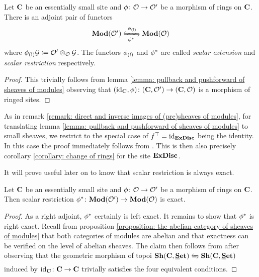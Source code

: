 \begin{corollary}
	\label{corollary: change of rings}
	
	Let ${{\mathbf{C}}}$ be an essentially small site and $\phi\colon {\mathcal{O}} \to {\mathcal{O}}'$ be a morphism of rings on ${{\mathbf{C}}}$. There is an adjoint pair of functors
		$$\mod {\structsymbol'} \xleftrightarrows{\scalarExtension{\phi}}{\scalarRestriction{\phi}} \mod\structsymbol$$
	where ${\phi_{(!)}}{\mathcal{G}} \coloneqq {\mathcal{O}}' \otimes_{\mathcal{O}} {\mathcal{G}}$. The functors ${\phi_{(!)}}$ and ${\phi^\ast}$ are called \emph{scalar extension} and \emph{scalar restriction} respectively.
\end{corollary}
\begin{proof}
	This trivially follows from lemma \ref{lemma: pullback and pushforward of sheaves of modules} observing that $(\mathrm{id}_{{\mathbf{C}}}, \phi)\colon ({{\mathbf{C}}},{\mathcal{O}}')\to({{\mathbf{C}}}, {\mathcal{O}})$ is a morphism of ringed sites.
\end{proof}


\begin{remark}
	As in remark \ref{remark: direct and inverse images of (pre)sheaves of modules}, for translating lemma \ref{lemma: pullback and pushforward of sheaves of modules} to small sheaves, we restrict to the special case of $f^\top = \mathrm{id}_{\mathbf{ExDisc}}$ being the identity. In this case the proof immediately follows from \cite[\href{https://stacks.math.columbia.edu/tag/03CZ}{Tag 03CZ}]{stacks-project}. This is then also precisely corollary \ref{corollary: change of rings} for the site ${\mathbf{ExDisc}}$.
\end{remark}

It will prove useful later on to know that scalar restriction is always exact.
\begin{lemma}
	Let ${{\mathbf{C}}}$ be an essentially small site and $\phi\colon {\mathcal{O}} \to {\mathcal{O}}'$ be a morphism of rings on ${{\mathbf{C}}}$. Then scalar restriction ${\phi^\ast}\colon {{\mathbf{Mod}}({\mathcal{O}}')}\to{{\mathbf{Mod}}({\mathcal{O}})}$ is exact.
\end{lemma}
\begin{proof}
	As a right adjoint, ${\phi^\ast}$ certainly is left exact. It remains to show that ${\phi^\ast}$ is right exact. Recall from proposition \ref{proposition: the abelian category of sheaves of modules} that both categories of modules are abelian and that exactness can be verified on the level of abelian sheaves. The claim then follows from \cite[\href{https://stacks.math.columbia.edu/tag/04DB}{Tag 04DB}]{stacks-project} after observing that the geometric morphism of topoi $\Sheaves{\site{C}}{\Set} \xleftrightarrows{}{} \Sheaves{\site{C}}{\Set}$ induced by $\mathrm{id}_{{\mathbf{C}}}\colon {{\mathbf{C}}}\to {{\mathbf{C}}}$ trivially satisfies the four equivalent conditions. 
\end{proof}

